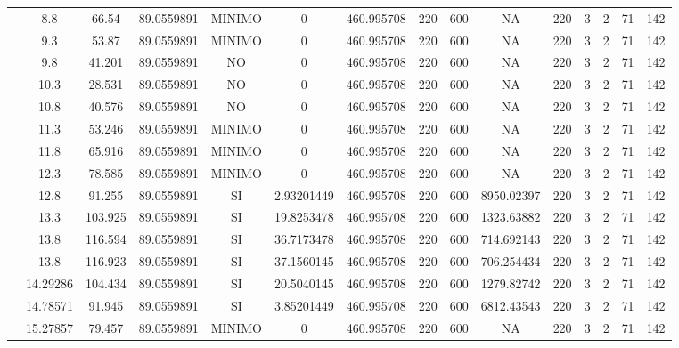 \begin{table}[H]
{\begin{tabular}{|c|c|c|c|c|c|c|c|c|c|c|c|c|c|c|}
\cline{2-15}    & 8.8 & 66.54 & 89.0559891 & MINIMO & 0   & 460.995708 & 220 & 600 & NA  & 220 & 3   & 2   & 71  & 142 \bigstrut\\
\cline{2-15}    & 9.3 & 53.87 & 89.0559891 & MINIMO & 0   & 460.995708 & 220 & 600 & NA  & 220 & 3   & 2   & 71  & 142 \bigstrut\\
\cline{2-15}    & 9.8 & 41.201 & 89.0559891 & NO  & 0   & 460.995708 & 220 & 600 & NA  & 220 & 3   & 2   & 71  & 142 \bigstrut\\
\cline{2-15}    & 10.3 & 28.531 & 89.0559891 & NO  & 0   & 460.995708 & 220 & 600 & NA  & 220 & 3   & 2   & 71  & 142 \bigstrut\\
\cline{2-15}    & 10.8 & 40.576 & 89.0559891 & NO  & 0   & 460.995708 & 220 & 600 & NA  & 220 & 3   & 2   & 71  & 142 \bigstrut\\
\cline{2-15}    & 11.3 & 53.246 & 89.0559891 & MINIMO & 0   & 460.995708 & 220 & 600 & NA  & 220 & 3   & 2   & 71  & 142 \bigstrut\\
\cline{2-15}    & 11.8 & 65.916 & 89.0559891 & MINIMO & 0   & 460.995708 & 220 & 600 & NA  & 220 & 3   & 2   & 71  & 142 \bigstrut\\
\cline{2-15}    & 12.3 & 78.585 & 89.0559891 & MINIMO & 0   & 460.995708 & 220 & 600 & NA  & 220 & 3   & 2   & 71  & 142 \bigstrut\\
\cline{2-15}    & 12.8 & 91.255 & 89.0559891 & SI  & 2.93201449 & 460.995708 & 220 & 600 & 8950.02397 & 220 & 3   & 2   & 71  & 142 \bigstrut\\
\cline{2-15}    & 13.3 & 103.925 & 89.0559891 & SI  & 19.8253478 & 460.995708 & 220 & 600 & 1323.63882 & 220 & 3   & 2   & 71  & 142 \bigstrut\\
\cline{2-15}    & 13.8 & 116.594 & 89.0559891 & SI  & 36.7173478 & 460.995708 & 220 & 600 & 714.692143 & 220 & 3   & 2   & 71  & 142 \bigstrut\\
\cline{2-15}    & 13.8 & 116.923 & 89.0559891 & SI  & 37.1560145 & 460.995708 & 220 & 600 & 706.254434 & 220 & 3   & 2   & 71  & 142 \bigstrut\\
\cline{2-15}    & 14.29286 & 104.434 & 89.0559891 & SI  & 20.5040145 & 460.995708 & 220 & 600 & 1279.82742 & 220 & 3   & 2   & 71  & 142 \bigstrut\\
\cline{2-15}    & 14.78571 & 91.945 & 89.0559891 & SI  & 3.85201449 & 460.995708 & 220 & 600 & 6812.43543 & 220 & 3   & 2   & 71  & 142 \bigstrut\\
\cline{2-15}    & 15.27857 & 79.457 & 89.0559891 & MINIMO & 0   & 460.995708 & 220 & 600 & NA  & 220 & 3   & 2   & 71  & 142 \bigstrut\\

\end{tabular}}
\end{table}
